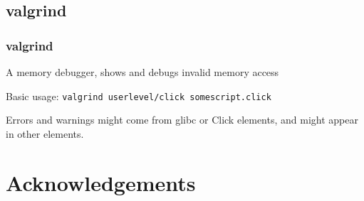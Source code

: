 \documentclass{beamer}
\begin{document}
\subsection{valgrind} %
\label{sub:valgrind}

\begin{frame}
\frametitle{valgrind}
A memory debugger, shows and debugs invalid memory access

Basic usage: \lstinline!valgrind userlevel/click somescript.click!

Errors and warnings might come from glibc or Click elements, and might appear in other elements.
\end{frame}

\section*{Acknowledgements}
\end{document}
